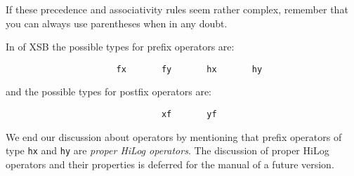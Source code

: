 If these precedence and associativity rules seem rather complex, remember
that you can always use parentheses when in any doubt.

In \version{} of XSB the possible types for prefix operators are:
\begin{verbatim}
                      fx       fy       hx       hy
\end{verbatim}
and the possible types for postfix operators are:
\begin{verbatim}
                               xf       yf
\end{verbatim}

We end our discussion about operators by mentioning that prefix
operators of type {\tt hx} and {\tt hy} are {\em proper HiLog
  operators}.  The discussion of proper HiLog operators and their
properties is deferred for the manual of a future version.

